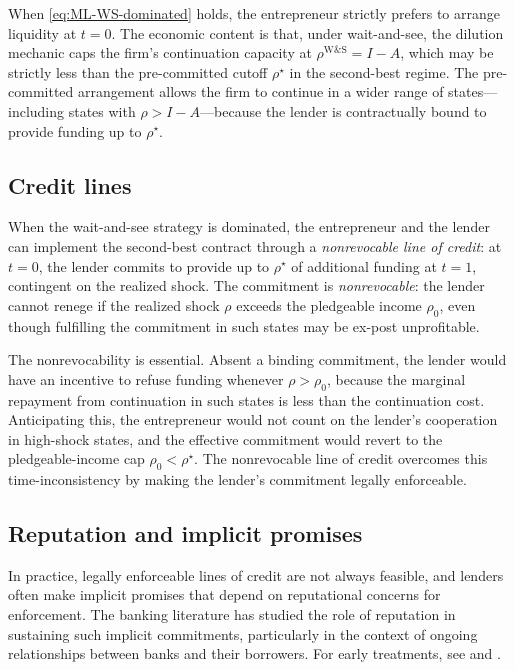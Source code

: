 \documentclass[11pt,a4paper,oneside]{book}
\theoremstyle{plain}
\theoremstyle{definition}
\theoremstyle{remark}
\numberwithin{equation}{chapter}
\begin{document}
When \eqref{eq:ML-WS-dominated} holds, the entrepreneur strictly prefers to arrange liquidity at $t=0$.
The economic content is that, under wait-and-see, the dilution mechanic caps the firm's continuation capacity at $\rho^{\text{W\&S}} = I - A$, which may be strictly less than the pre-committed cutoff $\rho^\star$ in the second-best regime.
The pre-committed arrangement allows the firm to continue in a wider range of states---including states with $\rho > I - A$---because the lender is contractually bound to provide funding up to $\rho^\star$.

\subsection{Credit lines}

When the wait-and-see strategy is dominated, the entrepreneur and the lender can implement the second-best contract through a \emph{nonrevocable line of credit}: at $t=0$, the lender commits to provide up to $\rho^\star$ of additional funding at $t=1$, contingent on the realized shock.
The commitment is \emph{nonrevocable}: the lender cannot renege if the realized shock $\rho$ exceeds the pledgeable income $\rho_0$, even though fulfilling the commitment in such states may be ex-post unprofitable.

The nonrevocability is essential.
Absent a binding commitment, the lender would have an incentive to refuse funding whenever $\rho > \rho_0$, because the marginal repayment from continuation in such states is less than the continuation cost.
Anticipating this, the entrepreneur would not count on the lender's cooperation in high-shock states, and the effective commitment would revert to the pledgeable-income cap $\rho_0 < \rho^\star$.
The nonrevocable line of credit overcomes this time-inconsistency by making the lender's commitment legally enforceable.

\subsection{Reputation and implicit promises}

In practice, legally enforceable lines of credit are not always feasible, and lenders often make implicit promises that depend on reputational concerns for enforcement.
The banking literature has studied the role of reputation in sustaining such implicit commitments, particularly in the context of ongoing relationships between banks and their borrowers.
For early treatments, see \citet{BootThakorUdell1987} and \citet{BootGreenbaumThakor1993}.
\end{document}
